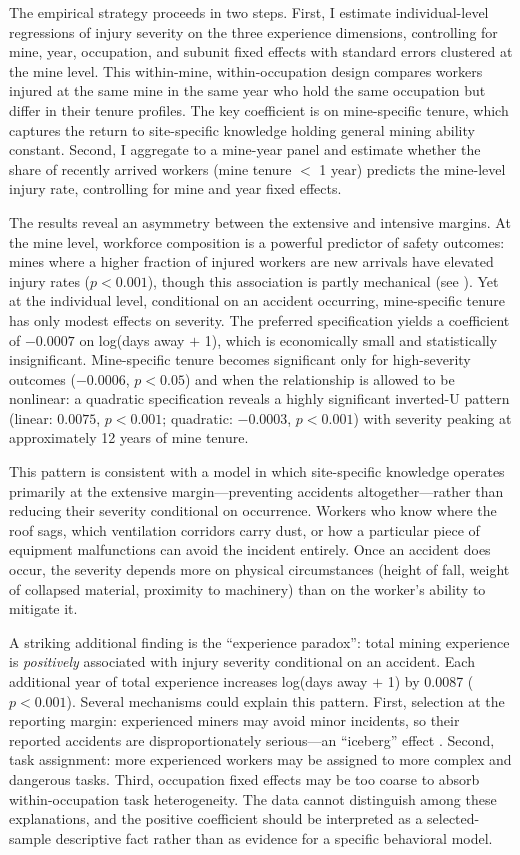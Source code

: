 \documentclass[12pt]{article}
\begin{document}
The empirical strategy proceeds in two steps. First, I estimate individual-level regressions of injury severity on the three experience dimensions, controlling for mine, year, occupation, and subunit fixed effects with standard errors clustered at the mine level. This within-mine, within-occupation design compares workers injured at the same mine in the same year who hold the same occupation but differ in their tenure profiles. The key coefficient is on mine-specific tenure, which captures the return to site-specific knowledge holding general mining ability constant. Second, I aggregate to a mine-year panel and estimate whether the share of recently arrived workers (mine tenure $<$ 1 year) predicts the mine-level injury rate, controlling for mine and year fixed effects.

The results reveal an asymmetry between the extensive and intensive margins. At the mine level, workforce composition is a powerful predictor of safety outcomes: mines where a higher fraction of injured workers are new arrivals have elevated injury rates ($p < 0.001$), though this association is partly mechanical (see ). Yet at the individual level, conditional on an accident occurring, mine-specific tenure has only modest effects on severity. The preferred specification yields a coefficient of $-0.0007$ on log(days away $+$ 1), which is economically small and statistically insignificant. Mine-specific tenure becomes significant only for high-severity outcomes ($-0.0006$, $p < 0.05$) and when the relationship is allowed to be nonlinear: a quadratic specification reveals a highly significant inverted-U pattern (linear: $0.0075$, $p < 0.001$; quadratic: $-0.0003$, $p < 0.001$) with severity peaking at approximately 12 years of mine tenure.

This pattern is consistent with a model in which site-specific knowledge operates primarily at the extensive margin---preventing accidents altogether---rather than reducing their severity conditional on occurrence. Workers who know where the roof sags, which ventilation corridors carry dust, or how a particular piece of equipment malfunctions can avoid the incident entirely. Once an accident does occur, the severity depends more on physical circumstances (height of fall, weight of collapsed material, proximity to machinery) than on the worker's ability to mitigate it.

A striking additional finding is the ``experience paradox'': total mining experience is \textit{positively} associated with injury severity conditional on an accident. Each additional year of total experience increases log(days away $+$ 1) by 0.0087 ($p < 0.001$). Several mechanisms could explain this pattern. First, selection at the reporting margin: experienced miners may avoid minor incidents, so their reported accidents are disproportionately serious---an ``iceberg'' effect \citep{Heinrich1931}. Second, task assignment: more experienced workers may be assigned to more complex and dangerous tasks. Third, occupation fixed effects may be too coarse to absorb within-occupation task heterogeneity. The data cannot distinguish among these explanations, and the positive coefficient should be interpreted as a selected-sample descriptive fact rather than as evidence for a specific behavioral model.
\end{document}
